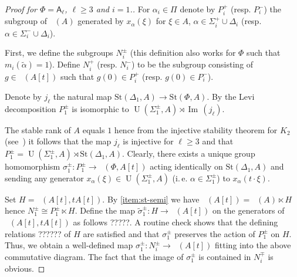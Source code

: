 \documentclass[oneside,12pt]{amsart}
\numberwithin{equation}{section}
\numberwithin{lem}{section}
\theoremstyle{definition}
\theoremstyle{remark}
\DeclareMathOperator{\UU}{U}
\DeclareMathOperator{\St}{St^G}
\DeclareMathOperator{\im}{Im\,}
\newcommand{\Stb}{\mathrm{St}}
\newcommand{\rA}{\mathsf{A}}
\begin{document}
\begin{proof}[Proof for $\Phi=\rA_\ell$, $\ell\geq 3$ and $i=1$.]
 For $\alpha_i\in\Pi$ denote by $P_i^+$ (resp. $P_i^-$) the subgroup of $\St(A)$ generated by 
 $x_\alpha(\xi)$ for $\xi \in A$, $\alpha\in\Sigma_i^+ \cup \Delta_i$ (resp. $\alpha\in\Sigma_i^- \cup \Delta_i$).

 First, we define the subgroups $N_i^\pm$ (this definition also works for $\Phi$ such that $m_i(\widetilde{\alpha})=1$).
 Define $N_{i}^+$ (resp. $N_i^-$) to be the subgroup consisting of $g \in \St(A[t])$ such that $g(0) \in P_i^+$ (resp. $g(0) \in P_i^-$).

 Denote by $j_\ell$ the natural map $\Stb(\Delta_1, A)\to \Stb(\Phi, A)$.
 By the Levi decomposition $P_1^\pm$ is isomorphic to $\UU(\Sigma_1^\pm, A) \rtimes \im(j_\ell)$.

 The stable rank of $A$ equals $1$ hence from the injective stability theorem for $K_2$ (see~\cite[Theorem~4.1]{ST76}) it follows that the map $j_\ell$ is injective for $\ell \geq 3$
 and that $P_1^\pm = \UU(\Sigma_1^\pm, A) \rtimes \Stb(\Delta_1,A)$.
 Clearly, there exists a unique group homomorphism $\sigma_1^\pm \colon P_1^\pm \to \St(\Phi, A[t])$ acting identically on $\Stb(\Delta_1, A)$ and sending
 any generator $x_\alpha(\xi) \in \UU(\Sigma_1^\pm, A)$ (i.\,e. $\alpha\in\Sigma_1^\pm$) to $x_\alpha(t\cdot \xi)$.

 
 Set $H=\St(A[t], tA[t])$.
 By \cref{item:st-semi} we have $\St(A[t]) = \St(A) \ltimes H$ hence $N_1^\pm \cong P_1^\pm \ltimes H.$
 Define the map $\widetilde{\sigma}^\pm_1 \colon H \to \St(A[t])$ on the generators of $\St(A[t], tA[t])$ as follows ?????.
 A routine check shows that the defining relations ?????? of $H$ are satisfied and that $\sigma_1^\pm$ preserves the action of $P_1^\pm$ on $H$.
 Thus, we obtain a well-defined map $\sigma_1^\pm:N_i^\pm \to \St(A[t])$ fitting into the above commutative diagram.
 The fact that the image of $\sigma_1^\pm$ is contained in $N_i^\mp$ is obvious. 
 \renewcommand{\qedsymbol}{} \end{proof}
\end{document}

